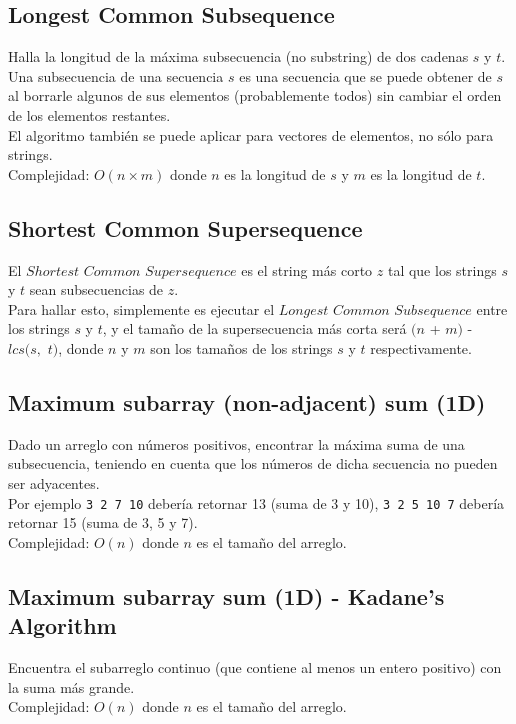 \documentclass[10pt,letterpaper,twocolumn]{article}
\newcommand{\source}[1]{
  
  \dotfill
}
\begin{document}
  \subsection{Longest Common Subsequence}
  Halla la longitud de la máxima subsecuencia (no substring) de dos cadenas $s$ y $t$.\\
  Una subsecuencia de una secuencia $s$ es una secuencia que se puede obtener de $s$ al borrarle algunos de sus elementos (probablemente todos) sin cambiar el orden de los elementos restantes.\\
  El algoritmo también se puede aplicar para vectores de elementos, no sólo para strings.\\
  Complejidad: $O(n \times m)$ donde $n$ es la longitud de $s$ y $m$ es la longitud de $t$.\\
  \source{./src/lcs.cpp}
  \subsection{Shortest Common Supersequence}
  El $Shortest$ $Common$ $Supersequence$ es el string más corto $z$ tal que los strings $s$ y $t$ sean subsecuencias de $z$.\\
  Para hallar esto, simplemente es ejecutar el $Longest$ $Common$ $Subsequence$ entre los strings $s$ y $t$, y el tamaño de la supersecuencia más corta será $(n$ + $m)$ - $lcs(s,$ $t)$, donde $n$ y $m$ son los tamaños de los strings $s$ y $t$ respectivamente.
  \subsection{Maximum subarray (non-adjacent) sum (1D)}
    Dado un arreglo con números positivos, encontrar la máxima suma de una subsecuencia, teniendo en cuenta que los números de dicha secuencia no pueden ser adyacentes. \\
    Por ejemplo \texttt{3 2 7 10} debería retornar 13 (suma de 3 y 10), \texttt{3 2 5 10 7} debería retornar 15 (suma de 3, 5 y 7). \\
    Complejidad: $O(n)$ donde $n$ es el tamaño del arreglo.
    \source{./src/non-adjacent_max_sum.cpp}
  \subsection{Maximum subarray sum (1D) - Kadane's Algorithm}
    Encuentra el subarreglo continuo (que contiene al menos un entero positivo) con la suma más grande. \\
    Complejidad: $O(n)$ donde $n$ es el tamaño del arreglo.
    \source{./src/kadane.cpp}
\end{document}
